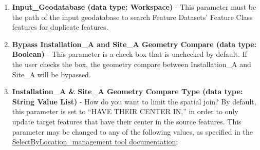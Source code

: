 \documentclass[openany]{book}
\providecommand{\tightlist}{%
  \setlength{\itemsep}{0pt}\setlength{\parskip}{0pt}}
\theoremstyle{definition}
\theoremstyle{definition}
\theoremstyle{definition}
\theoremstyle{remark}
\begin{document}
\begin{enumerate}
\def\labelenumi{\arabic{enumi}.}
\tightlist
\item
  \textbf{Input\_Geodatabase (data type: Workspace)} - This parameter
  must be the path of the input geodatabase to search Feature Datasets'
  Feature Class features for duplicate features.\\
\item
  \textbf{Bypass Installation\_A and Site\_A Geometry Compare (data
  type: Boolean)} - This parameter is a check box that is unchecked by
  default. If the user checks the box, the geometry compare between
  Installation\_A and Site\_A will be bypassed.
\item
  \textbf{Installation\_A \& Site\_A Geometry Compare Type (data type:
  String Value List)} - How do you want to limit the spatial join? By
  default, this parameter is set to ``HAVE THEIR CENTER IN,'' in order
  to only update target features that have their center in the source
  features. This parameter may be changed to any of the following
  values, as specified in the
  \href{http://desktop.arcgis.com/en/arcmap/latest/tools/data-management-toolbox/select-layer-by-location.htm}{SelectByLocation\_management
  tool documentation}:


\end{enumerate}
\end{document}
